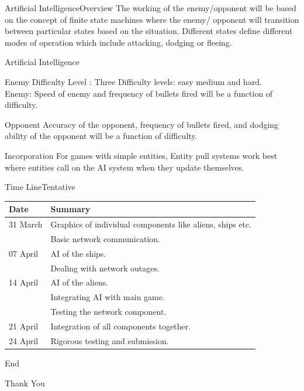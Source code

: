 \documentclass{beamer}
\begin{document}
\begin{frame}{Artificial Intelligence}{Overview}
  The working of the enemy/opponent will be based on the concept of finite state machines where the enemy/ opponent will transition between particular states based on the situation. Different states define different modes of operation which include attacking, dodging or fleeing.
\end{frame}

\begin{frame}{Artificial Intelligence}{}
	\begin{block}{Enemy}
  			Difficulty Level : Three Difficulty levels: easy medium and hard. \\
			Enemy: Speed of enemy and frequency of bullets fired will be a function of difficulty.
 	\end{block}
	\begin{block}{Opponent} 
  			Accuracy of the opponent, frequency of bullets fired, and dodging ability of the opponent will be a function of difficulty.
	\end{block}
	\begin{block}{Incorporation}
		For games with simple entities, Entity pull systems work best where entities call on the AI system when they update themselves.
	\end{block}
\end{frame}

\begin{frame}{Time Line}{Tentative}
	  \begin{center}
    \begin{tabular}{ | l | p{9cm} |}
    \hline
    Date &  Summary \\ \hline
    31 March & Graphics of individual components like aliens, ships etc. \\ & Basic network communication.\\ \hline
    07 April & AI of the ships.\\ &  Dealing with network outages.\\ \hline
    14 April & AI of the aliens. \\ & Integrating AI with main game.\\ & Testing the network component. \\ \hline
    21 April & Integration of all components together. \\ \hline
    24 April & Rigorous testing and submission. \\ 
    \hline
    \end{tabular}
\end{center}
\end{frame}

\begin{frame}{End}
	\vfill
	\begin{center}
		\Huge{Thank You}
	\end{center}
	\vfill
\end{frame}
\end{document}
